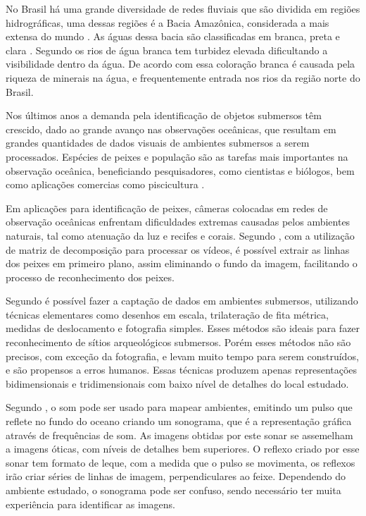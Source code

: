No Brasil há uma grande diversidade de redes fluviais que são dividida em regiões hidrográficas, uma dessas regiões é a Bacia Amazônica, considerada a mais extensa do mundo \cite{portalbrasil:2009} \cite{Baier:2008}. As águas dessa bacia são classificadas em branca, preta e clara \cite{sioli:2012}. Segundo  os rios de água branca tem turbidez elevada dificultando a visibilidade dentro da água. De acordo com  essa coloração branca é causada pela riqueza de minerais na água, e frequentemente entrada nos rios da região norte do Brasil.

Nos últimos anos a demanda pela identificação de objetos submersos têm crescido, dado ao grande avanço nas observações oceânicas, que resultam em grandes quantidades de dados visuais de ambientes submersos a serem processados. Espécies de peixes e população são as tarefas mais importantes na observação oceânica, beneficiando pesquisadores, como cientistas e biólogos, bem como aplicações comercias como piscicultura \cite{Qin:2016}. 

Em aplicações para identificação de peixes, câmeras colocadas em redes de observação oceânicas enfrentam dificuldades extremas causadas pelos ambientes naturais, tal como atenuação da luz e recifes e corais. Segundo , com a utilização de matriz de decomposição para processar os vídeos, é possível extrair as linhas dos peixes em primeiro plano, assim eliminando o fundo da imagem, facilitando o processo de reconhecimento dos peixes.

Segundo  é possível fazer a captação de dados em ambientes submersos, utilizando técnicas elementares como desenhos em escala, trilateração de fita métrica, medidas de deslocamento e fotografia simples. Esses métodos são ideais para fazer reconhecimento de sítios arqueológicos submersos. Porém esses métodos não são precisos, com exceção da fotografia, e levam muito tempo para serem construídos, e são propensos a erros humanos. Essas técnicas produzem apenas representações bidimensionais e tridimensionais com baixo nível de detalhes do local estudado.

Segundo , o som pode ser usado para mapear ambientes, emitindo um pulso que reflete no fundo do oceano criando um sonograma, que é a representação gráfica através de frequências de som. As imagens obtidas por este sonar se assemelham a imagens óticas, com níveis de detalhes bem superiores. O reflexo criado por esse sonar tem formato de leque, com a medida que o pulso se movimenta, os reflexos irão criar séries de linhas de imagem, perpendiculares ao feixe. Dependendo do ambiente estudado, o sonograma pode ser confuso, sendo necessário ter muita experiência para identificar as imagens.

